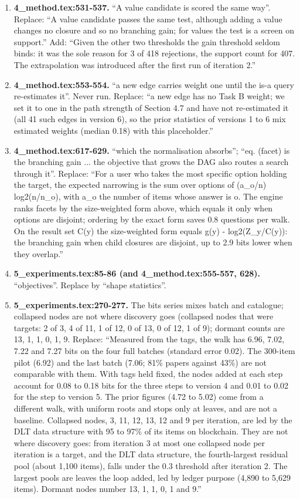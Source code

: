 \documentclass[10pt,a4paper]{article}
\begin{document}
{\begin{enumerate}[leftmargin=1.8em,itemsep=0.45em]
\item \textbf{4\_method.tex:531-537.} ``A value candidate is scored the same way''. Replace: ``A value candidate passes the same test, although adding a value changes no closure and so no branching gain; for values the test is a screen on support.'' Add: ``Given the other two thresholds the gain threshold seldom binds: it was the sole reason for 3 of 418 rejections, the support count for 407. The extrapolation was introduced after the first run of iteration 2.''
\item \textbf{4\_method.tex:553-554.} ``a new edge carries weight one until the is-a query re-estimates it''. Never run. Replace: ``a new edge has no Task B weight; we set it to one in the path strength of Section 4.7 and have not re-estimated it (all 41 such edges in version 6), so the prior statistics of versions 1 to 6 mix estimated weights (median 0.18) with this placeholder.''
\item \textbf{4\_method.tex:617-629.} ``which the normalisation absorbs''; ``eq. (facet) is the branching gain ... the objective that grows the DAG also routes a search through it''. Replace: ``For a user who takes the most specific option holding the target, the expected narrowing is the sum over options of (a\_o/n) log2(n/n\_o), with a\_o the number of items whose answer is o. The engine ranks facets by the size-weighted form above, which equals it only when options are disjoint; ordering by the exact form saves 0.8 questions per walk. On the result set C(y) the size-weighted form equals g(y) - log2(Z\_y/\textbar{}C(y)\textbar{}): the branching gain when child closures are disjoint, up to 2.9 bits lower when they overlap.''
\item \textbf{5\_experiments.tex:85-86 (and 4\_method.tex:555-557, 628).} ``objectives''. Replace by ``shape statistics''.
\item \textbf{5\_experiments.tex:270-277.} The bits series mixes batch and catalogue; collapsed nodes are not where discovery goes (collapsed nodes that were targets: 2 of 3, 4 of 11, 1 of 12, 0 of 13, 0 of 12, 1 of 9); dormant counts are 13, 1, 1, 0, 1, 9. Replace: ``Measured from the tags, the walk has 6.96, 7.02, 7.22 and 7.27 bits on the four full batches (standard error 0.02). The 300-item pilot (6.92) and the last batch (7.06; 81\% papers against 43\%) are not comparable with them. With tags held fixed, the nodes added at each step account for 0.08 to 0.18 bits for the three steps to version 4 and 0.01 to 0.02 for the step to version 5. The prior figures (4.72 to 5.02) come from a different walk, with uniform roots and stops only at leaves, and are not a baseline. Collapsed nodes, 3, 11, 12, 13, 12 and 9 per iteration, are led by the DLT data structure with 95 to 97\% of its items on blockchain. They are not where discovery goes: from iteration 3 at most one collapsed node per iteration is a target, and the DLT data structure, the fourth-largest residual pool (about 1,100 items), falls under the 0.3 threshold after iteration 2. The largest pools are leaves the loop added, led by ledger purpose (4,890 to 5,629 items). Dormant nodes number 13, 1, 1, 0, 1 and 9.''

\end{enumerate}}
\end{document}
